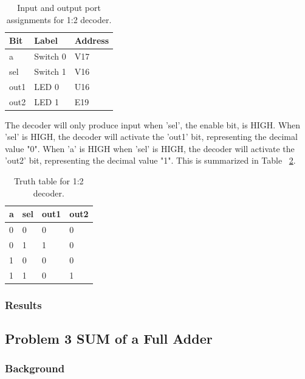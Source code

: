 \documentclass[11pt]{article}
\begin{document}
\begin{table}[h]
\begin{center}
		\begin{tabular}{| l | l | l |}
			\hline
			Bit & Label & Address \\ \hline
			a & Switch 0 & V17 \\ \hline
			sel & Switch 1 & V16 \\ \hline
			out1 & LED 0 & U16 \\ \hline
			out2 & LED 1 & E19 \\ \hline
		\end{tabular}
		\caption{\label{tab: tab-name} Input and output port assignments for 1:2 decoder.}
		\label{tab:decoderPort}
\end{center}
\end{table}

The decoder will only produce input when 'sel', the enable bit, is HIGH. When 'sel' is HIGH, the decoder will activate the 'out1' bit, representing the decimal value "0". When 'a' is HIGH when 'sel' is HIGH, the decoder will activate the 'out2' bit, representing the decimal value "1". This is summarized in Table ~\ref{tab:decoderTruthTable}.

\begin{table}[h]
\begin{center}
	\begin{tabular}{| l | l | l | l |}
		\hline
		a & sel & out1 & out2 \\ \hline
		0 & 0 & 0 & 0 \\ \hline
		0 & 1 & 1 & 0 \\ \hline
		1 & 0 & 0 & 0 \\ \hline
		1 & 1 & 0 & 1 \\ \hline
	\end{tabular}
	\caption{\label{tab:decoderTruthTable} Truth table for 1:2 decoder.}
	\label{tab:decoderTruthTable}
\end{center}
\end{table}

\subsubsection{Results}

\subsection{Problem 3 SUM of a Full Adder}

\subsubsection{Background}
\end{document}
